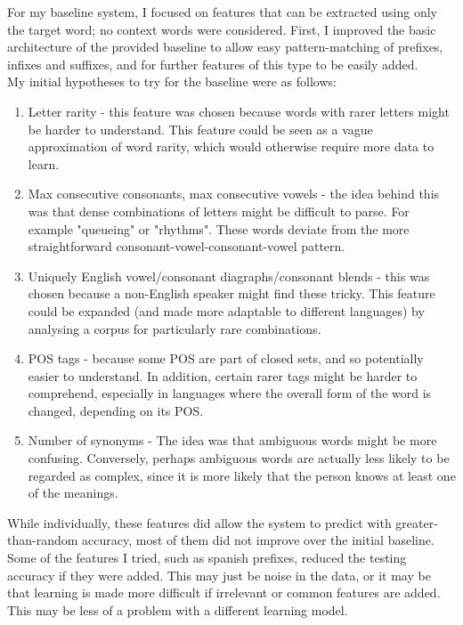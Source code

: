 \documentclass[11pt,a4paper]{article}
\begin{document}
For my baseline system, I focused on features that can be extracted using only the target word; no context words were considered. First, I improved the basic architecture of the provided baseline to allow easy pattern-matching of prefixes, infixes and suffixes, and for further features of this type to be easily added.\\


My initial hypotheses to try for the baseline were as follows:
\begin{enumerate}
\item Letter rarity - this feature was chosen because words with rarer letters might be harder to understand. This feature could be seen as a vague approximation of word rarity, which would otherwise require more data to learn.
\item Max consecutive consonants, max consecutive vowels - the idea behind this was that dense combinations of letters might be difficult to parse. For example "queueing" or "rhythms". These words deviate from the more straightforward consonant-vowel-consonant-vowel pattern.
\item Uniquely English vowel/consonant diagraphs/consonant blends - this was chosen because a non-English speaker might find these tricky. This feature could be expanded (and made more adaptable to different languages) by analysing a corpus for particularly rare combinations.
\item POS tags - because some POS are part of closed sets, and so potentially easier to understand. In addition, certain rarer tags might be harder to comprehend, especially in languages where the overall form of the word is changed, depending on its POS.
\item Number of synonyms - The idea was that ambiguous words might be more confusing. Conversely, perhaps ambiguous words are actually less likely to be regarded as complex, since it is more likely that the person knows at least one of the meanings.
\end{enumerate}

While individually, these features did allow the system to predict with greater-than-random accuracy, most of them did not improve over the initial baseline. Some of the features I tried, such as spanish prefixes, reduced the testing accuracy if they were added. This may just be noise in the data, or it may be that learning is made more difficult if irrelevant or common features are added. This may be less of a problem with a different learning model.
\end{document}
